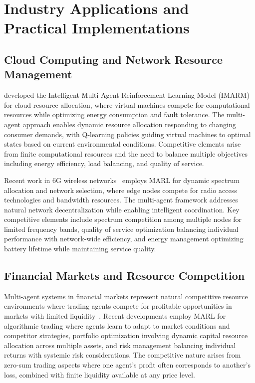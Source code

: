 \section{Industry Applications and Practical Implementations}

\subsection{Cloud Computing and Network Resource Management}

\textcite{belgacem_intelligent_2022} developed the Intelligent Multi-Agent Reinforcement Learning Model (IMARM) for cloud resource allocation, where virtual machines compete for computational resources while optimizing energy consumption and fault tolerance. The multi-agent approach enables dynamic resource allocation responding to changing consumer demands, with Q-learning policies guiding virtual machines to optimal states based on current environmental conditions. Competitive elements arise from finite computational resources and the need to balance multiple objectives including energy efficiency, load balancing, and quality of service.

Recent work in 6G wireless networks~\autocite{zhang_multi-agent_2025} employs MARL for dynamic spectrum allocation and network selection, where edge nodes compete for radio access technologies and bandwidth resources. The multi-agent framework addresses natural network decentralization while enabling intelligent coordination. Key competitive elements include spectrum competition among multiple nodes for limited frequency bands, quality of service optimization balancing individual performance with network-wide efficiency, and energy management optimizing battery lifetime while maintaining service quality.

\subsection{Financial Markets and Resource Competition}

Multi-agent systems in financial markets represent natural competitive resource environments where trading agents compete for profitable opportunities in markets with limited liquidity~\autocite{shavandi_multi-agent_2022}. Recent developments employ MARL for algorithmic trading where agents learn to adapt to market conditions and competitor strategies, portfolio optimization involving dynamic capital resource allocation across multiple assets, and risk management balancing individual returns with systemic risk considerations. The competitive nature arises from zero-sum trading aspects where one agent's profit often corresponds to another's loss, combined with finite liquidity available at any price level.

